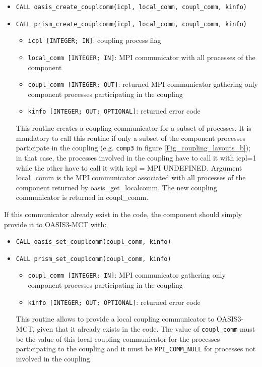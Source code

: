 \begin{itemize}
\item {\tt CALL oasis\_create\_couplcomm(icpl, local\_comm,
    coupl\_comm, kinfo)}
\item {\tt CALL prism\_create\_couplcomm(icpl, local\_comm,
    coupl\_comm, kinfo)}
  \begin{itemize}
  \item {\tt icpl [INTEGER; IN]}: coupling process flag
  \item {\tt local\_comm [INTEGER; IN]}: MPI communicator with all
    processes of the component
  \item {\tt coupl\_comm [INTEGER; OUT]}: returned MPI communicator
    gathering only component processes participating in the coupling
  \item {\tt kinfo [INTEGER; OUT; OPTIONAL]}: returned error code
  \end{itemize}

  This routine creates a coupling communicator for a subset of
  processes. It is mandatory to call this routine if only a subset of
  the component processes participate in the coupling (e.g. {\tt comp3} in figure
    \ref{Fig_coupling_layouts_b}); in that case, the processes
    involved in the coupling have to call it with icpl=1 while the
    other have to call it with icpl = MPI UNDEFINED. Argument
    local\_comm is the MPI communicator associated with all processes
    of the component returned by oasis\_get\_localcomm. The new coupling 
    communicator is returned in coupl\_comm.

\end{itemize}
If this communicator already exist in the code, the component should
simply provide it to OASIS3-MCT with:

\begin{itemize}
\item {\tt CALL oasis\_set\_couplcomm(coupl\_comm, kinfo)}
\item {\tt CALL prism\_set\_couplcomm(coupl\_comm, kinfo)}
  \begin{itemize}
  \item {\tt coupl\_comm [INTEGER; IN]}: MPI communicator gathering
    only component processes participating in the coupling
  \item {\tt kinfo [INTEGER; OUT; OPTIONAL]}: returned error code
  \end{itemize}

  This routine allows to provide a local coupling communicator to
  OASIS3-MCT, given that it already exists in the code. The value of
  {\tt coupl\_comm} must be the value of this local coupling
  communicator for the processes participating to the coupling and it
  must be {\tt MPI\_COMM\_NULL} for processes not involved in the
  coupling.
\end{itemize}

